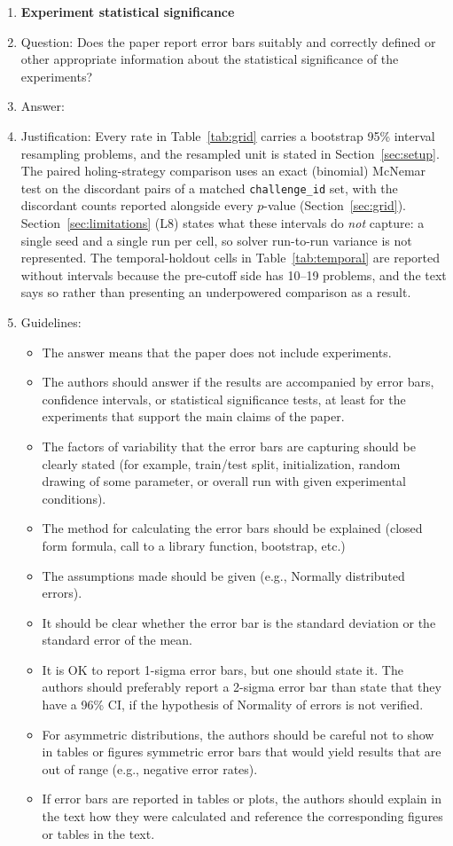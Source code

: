 \begin{enumerate}
\item {\bf Experiment statistical significance}
    \item[] Question: Does the paper report error bars suitably and correctly defined or other appropriate information about the statistical significance of the experiments?
    \item[] Answer: \answerYes{}
    \item[] Justification: Every rate in Table~\ref{tab:grid} carries a bootstrap 95\% interval resampling problems, and the resampled unit is stated in Section~\ref{sec:setup}. The paired holing-strategy comparison uses an exact (binomial) McNemar test on the discordant pairs of a matched \texttt{challenge\_id} set, with the discordant counts reported alongside every $p$-value (Section~\ref{sec:grid}). Section~\ref{sec:limitations} (L8) states what these intervals do \emph{not} capture: a single seed and a single run per cell, so solver run-to-run variance is not represented. The temporal-holdout cells in Table~\ref{tab:temporal} are reported without intervals because the pre-cutoff side has 10--19 problems, and the text says so rather than presenting an underpowered comparison as a result.
    \item[] Guidelines:
    \begin{itemize}
        \item The answer \answerNA{} means that the paper does not include experiments.
        \item The authors should answer \answerYes{} if the results are accompanied by error bars, confidence intervals, or statistical significance tests, at least for the experiments that support the main claims of the paper.
        \item The factors of variability that the error bars are capturing should be clearly stated (for example, train/test split, initialization, random drawing of some parameter, or overall run with given experimental conditions).
        \item The method for calculating the error bars should be explained (closed form formula, call to a library function, bootstrap, etc.)
        \item The assumptions made should be given (e.g., Normally distributed errors).
        \item It should be clear whether the error bar is the standard deviation or the standard error of the mean.
        \item It is OK to report 1-sigma error bars, but one should state it. The authors should preferably report a 2-sigma error bar than state that they have a 96\% CI, if the hypothesis of Normality of errors is not verified.
        \item For asymmetric distributions, the authors should be careful not to show in tables or figures symmetric error bars that would yield results that are out of range (e.g., negative error rates).
        \item If error bars are reported in tables or plots, the authors should explain in the text how they were calculated and reference the corresponding figures or tables in the text.
    \end{itemize}


\end{enumerate}

